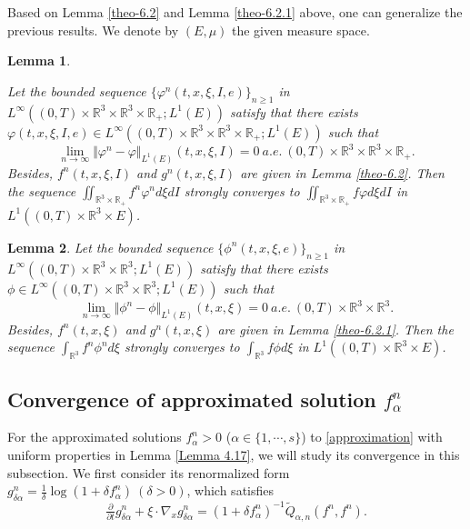 \documentclass[reqno,11pt]{amsart}
\newtheorem{lemma}{Lemma}[section]
\numberwithin{equation}{section}
\def\R{\mathbb{R}}
\begin{document}
Based on Lemma \ref{theo-6.2} and Lemma \ref{theo-6.2.1} above, one can generalize the previous results. We denote by $(E,\mu )$ the given measure space.

\begin{lemma}\label{theo-6.4}

Let the bounded sequence $\{ \varphi^n (t, x, \xi, I, e)\}_{n\geq 1}$ in $L^\infty ((0,T)\times \R^3 \times \R^3\times \R_+ ; L^1(E))$ satisfy that there exists $\varphi (t, x, \xi, I, e) \in L^\infty ((0,T)\times \R^3 \times \R^3 \times \R_+; L^1(E))$ such that 
\begin{equation*}
\lim \limits_{n\rightarrow \infty} \Vert \varphi^n -\varphi \Vert_{L^1(E)}(t,x,\xi,I)=0 \ a.e. \ (0,T)\times \R^3 \times \R^3\times \R_+.
\end{equation*}
Besides, $f^n (t, x, \xi, I)$ and $g^n (t, x, \xi, I)$ are given in Lemma \ref{theo-6.2}. Then the sequence $\iint_{\R^3\times \R_+} f^n\varphi^n d\xi dI$ strongly converges to $ \iint_{\R^3\times \R_+} f\varphi d\xi dI $ in $L^1((0,T)\times \R^3\times E)$.
\end{lemma}


\begin{lemma}\label{theo-6.4.1}
Let the bounded sequence $\{	\phi^n (t, x, \xi, e)\}_{n\geq 1}$ in $L^\infty ((0,T)\times \R^3 \times \R^3 ; L^1(E))$ satisfy that there exists $\phi \in L^\infty ((0,T)\times \R^3 \times \R^3 ; L^1(E))$ such that 
\begin{equation*}
	\lim \limits_{n\rightarrow \infty} \Vert \phi^n -\phi \Vert_{L^1(E)}(t,x,\xi)=0 \ a.e. \ (0,T)\times \R^3 \times \R^3.
\end{equation*}
Besides, $f^n (t, x, \xi)$ and $g^n (t, x, \xi)$ are given in Lemma \ref{theo-6.2.1}. Then the sequence $\int_{\R^3} f^n\phi^n d\xi $ strongly converges to $ \int_{\R^3 } f \phi d\xi $ in $L^1((0,T)\times \R^3\times E)$.
\end{lemma}


\subsection{Convergence of approximated solution $f^n_\alpha$}\label{Subsec:Cnv-f}

For the approximated solutions $f^n_\alpha > 0$ ($\alpha \in \{ 1, \cdots, s \}$) to \eqref{approximation} with uniform properties in Lemma \ref{Lemma 4.17}, we will study its convergence in this subsection. We first consider its renormalized form $g^n_{\delta \alpha }=\frac{1}{\delta} \log (1+\delta f^n_\alpha) \ (\delta >0)$, which satisfies
\begin{equation}\label{eq6.75}
	\tfrac{\partial }{\partial t} g^n_{\delta \alpha } + \xi \cdot \nabla_x g^n_{\delta \alpha } = (1+\delta f^n_\alpha)^{-1} \tilde{Q}_{\alpha ,n} (f^n,f^n).
\end{equation}
\end{document}
